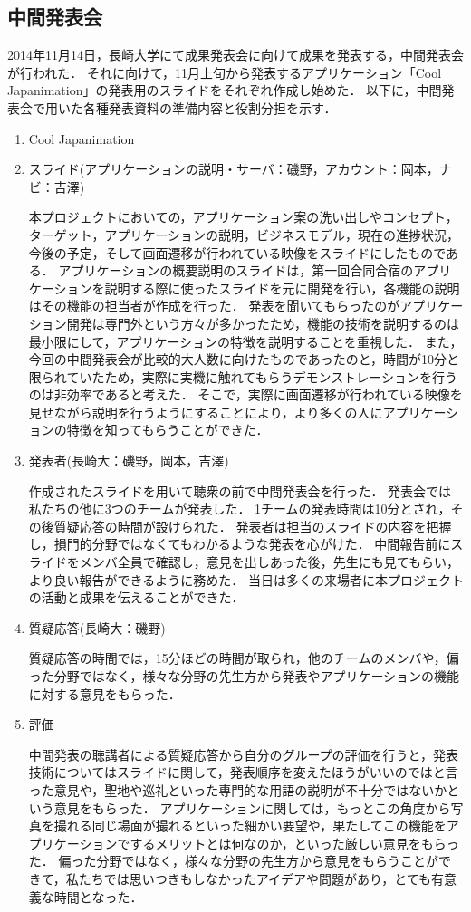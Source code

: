 \subsection{中間発表会} 
\par
2014年11月14日，長崎大学にて成果発表会に向けて成果を発表する，中間発表会が行われた．
それに向けて，11月上旬から発表するアプリケーション「Cool Japanimation」の発表用のスライドをそれぞれ作成し始めた．
以下に，中間発表会で用いた各種発表資料の準備内容と役割分担を示す．
\begin{enumerate}
\item Cool Japanimation　
\par
\item スライド(アプリケーションの説明・サーバ：磯野，アカウント：岡本，ナビ：吉澤) 
\par
本プロジェクトにおいての，アプリケーション案の洗い出しやコンセプト，ターゲット，アプリケーションの説明，ビジネスモデル，現在の進捗状況，今後の予定，そして画面遷移が行われている映像をスライドにしたものである．
アプリケーションの概要説明のスライドは，第一回合同合宿のアプリケーションを説明する際に使ったスライドを元に開発を行い，各機能の説明はその機能の担当者が作成を行った．
発表を聞いてもらったのがアプリケーション開発は専門外という方々が多かったため，機能の技術を説明するのは最小限にして，アプリケーションの特徴を説明することを重視した．
また，今回の中間発表会が比較的大人数に向けたものであったのと，時間が10分と限られていたため，実際に実機に触れてもらうデモンストレーションを行うのは非効率であると考えた．
そこで，実際に画面遷移が行われている映像を見せながら説明を行うようにすることにより，より多くの人にアプリケーションの特徴を知ってもらうことができた．
\item 発表者(長崎大：磯野，岡本，吉澤)
\par
作成されたスライドを用いて聴衆の前で中間発表会を行った．
発表会では私たちの他に3つのチームが発表した．
1チームの発表時間は10分とされ，その後質疑応答の時間が設けられた．
発表者は担当のスライドの内容を把握し，損門的分野ではなくてもわかるような発表を心がけた．
中間報告前にスライドをメンバ全員で確認し，意見を出しあった後，先生にも見てもらい，より良い報告ができるように務めた．
当日は多くの来場者に本プロジェクトの活動と成果を伝えることができた． 
\item 質疑応答(長崎大：磯野) 
\par
質疑応答の時間では，15分ほどの時間が取られ，他のチームのメンバや，偏った分野ではなく，様々な分野の先生方から発表やアプリケーションの機能に対する意見をもらった． 
\item 評価 
\par
中間発表の聴講者による質疑応答から自分のグループの評価を行うと，発表技術についてはスライドに関して，発表順序を変えたほうがいいのではと言った意見や，聖地や巡礼といった専門的な用語の説明が不十分ではないかという意見をもらった．
アプリケーションに関しては，もっとこの角度から写真を撮れる同じ場面が撮れるといった細かい要望や，果たしてこの機能をアプリケーションでするメリットとは何なのか，といった厳しい意見をもらった．
偏った分野ではなく，様々な分野の先生方から意見をもらうことができて，私たちでは思いつきもしなかったアイデアや問題があり，とても有意義な時間となった．
\end{enumerate}　
\par
{}
